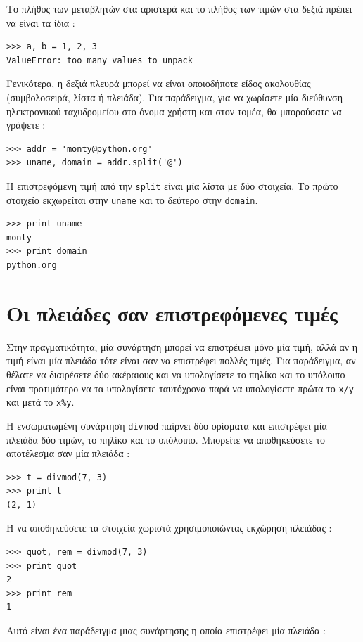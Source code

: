 \documentclass[10pt]{book}
\begin{document}
Το πλήθος των μεταβλητών στα αριστερά και το πλήθος των τιμών στα δεξιά πρέπει να είναι τα ίδια :

\begin{verbatim}
>>> a, b = 1, 2, 3
ValueError: too many values to unpack
\end{verbatim}
%
 Γενικότερα, η δεξιά πλευρά μπορεί να είναι οποιοδήποτε είδος ακολουθίας (συμβολοσειρά, λίστα ή πλειάδα). Για παράδειγμα, για να χωρίσετε μία διεύθυνση ηλεκτρονικού ταχυδρομείου στο όνομα χρήστη και στον τομέα, θα μπορούσατε να γράψετε : 

\begin{verbatim}
>>> addr = 'monty@python.org'
>>> uname, domain = addr.split('@')
\end{verbatim}
%
 Η επιστρεφόμενη τιμή από την  {\tt split}  είναι μία λίστα με δύο στοιχεία. Το πρώτο στοιχείο εκχωρείται στην  {\tt uname}  και το δεύτερο στην  {\tt domain}.

\begin{verbatim}
>>> print uname
monty
>>> print domain
python.org
\end{verbatim}
%

 
\section{Οι πλειάδες σαν επιστρεφόμενες τιμές}

Στην πραγματικότητα, μία συνάρτηση μπορεί να επιστρέψει μόνο μία τιμή, αλλά αν η τιμή είναι μία πλειάδα τότε είναι σαν να επιστρέφει πολλές τιμές. Για παράδειγμα, αν θέλατε να διαιρέσετε δύο ακέραιους και να υπολογίσετε το πηλίκο και το υπόλοιπο είναι προτιμότερο να τα υπολογίσετε ταυτόχρονα παρά να υπολογίσετε πρώτα το  {\tt x/y}  και μετά το  {\tt x\%y}.

 Η ενσωματωμένη συνάρτηση  {\tt divmod}  παίρνει δύο ορίσματα και επιστρέφει μία πλειάδα δύο τιμών, το πηλίκο και το υπόλοιπο. Μπορείτε να αποθηκεύσετε το αποτέλεσμα σαν μία πλειάδα :

\begin{verbatim}
>>> t = divmod(7, 3)
>>> print t
(2, 1)
\end{verbatim}
%
 Ή να αποθηκεύσετε τα στοιχεία χωριστά χρησιμοποιώντας εκχώρηση πλειάδας :

\begin{verbatim}
>>> quot, rem = divmod(7, 3)
>>> print quot
2
>>> print rem
1
\end{verbatim}
%
 Αυτό είναι ένα παράδειγμα μιας συνάρτησης η οποία επιστρέφει μία πλειάδα :
\end{document}
